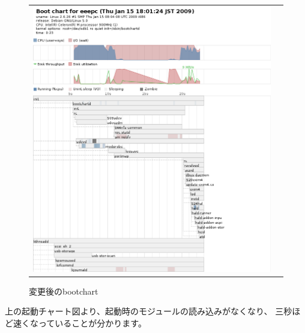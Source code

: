 \documentclass[mingoth,a4paper]{jsarticle}
\begin{document}
\begin{figure}[htbp]
\begin{tabular}{cc}
\begin{minipage}{0.5\textwidth}
\begin{center}
    \end{center}
   \end{minipage}
   \begin{minipage}{0.5\textwidth}
    \begin{center}
     \includegraphics[scale=0.45]{image200901/bootchart-eeepc-new.png}
     \caption{変更後のbootchart}
     \label{fig:bootchart-eeepc-new}
    \end{center}
   \end{minipage}
  \end{tabular}
\end{figure}
上の起動チャート図より、起動時のモジュールの読み込みがなくなり、
三秒ほど速くなっていることが分かります。
\end{document}
